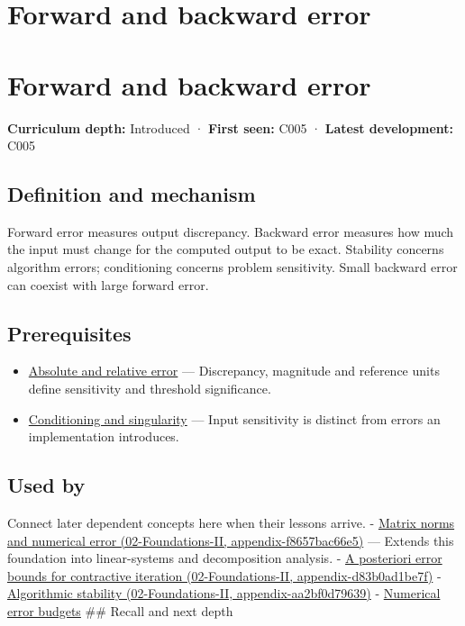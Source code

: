 \hypertarget{appendix-a7fbaf6d1b1c}{}
\section*{Forward and backward error}
\section{Forward and backward error}\label{appendix-a7fbaf6d1b1c-forward-and-backward-error}

\textbf{Curriculum depth:} Introduced · \textbf{First seen:} C005 · \textbf{Latest development:} C005

\subsection{Definition and mechanism}\label{appendix-a7fbaf6d1b1c-definition-and-mechanism}

Forward error measures output discrepancy. Backward error measures how much the input must change for the computed output to be exact. Stability concerns algorithm errors; conditioning concerns problem sensitivity. Small backward error can coexist with large forward error.

\subsection{Prerequisites}\label{appendix-a7fbaf6d1b1c-prerequisites}

\begin{itemize}
\tightlist
\item
  \hyperref[appendix-3ae74e89b4e6]{Absolute and relative error} --- Discrepancy, magnitude and reference units define sensitivity and threshold significance.
\item
  \hyperref[appendix-8f6a01f284a7]{Conditioning and singularity} --- Input sensitivity is distinct from errors an implementation introduces.
\end{itemize}

\subsection{Used by}\label{appendix-a7fbaf6d1b1c-used-by}

Connect later dependent concepts here when their lessons arrive. - \href{../02-Foundations-II/main.pdf\#nameddest=appendix-f8657bac66e5}{Matrix norms and numerical error (02-Foundations-II, appendix-f8657bac66e5)} --- Extends this foundation into linear-systems and decomposition analysis. - \href{../02-Foundations-II/main.pdf\#nameddest=appendix-d83b0ad1be7f}{A posteriori error bounds for contractive iteration (02-Foundations-II, appendix-d83b0ad1be7f)} - \href{../02-Foundations-II/main.pdf\#nameddest=appendix-aa2bf0d79639}{Algorithmic stability (02-Foundations-II, appendix-aa2bf0d79639)} - \hyperref[appendix-31b8c295e05f]{Numerical error budgets} \#\# Recall and next depth

